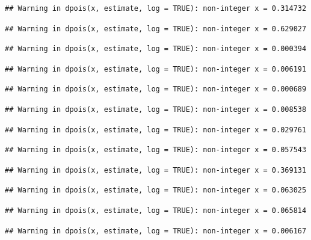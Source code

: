 \documentclass[]{article}
\begin{document}
\begin{verbatim}
## Warning in dpois(x, estimate, log = TRUE): non-integer x = 0.314732
\end{verbatim}

\begin{verbatim}
## Warning in dpois(x, estimate, log = TRUE): non-integer x = 0.629027
\end{verbatim}

\begin{verbatim}
## Warning in dpois(x, estimate, log = TRUE): non-integer x = 0.000394
\end{verbatim}

\begin{verbatim}
## Warning in dpois(x, estimate, log = TRUE): non-integer x = 0.006191
\end{verbatim}

\begin{verbatim}
## Warning in dpois(x, estimate, log = TRUE): non-integer x = 0.000689
\end{verbatim}

\begin{verbatim}
## Warning in dpois(x, estimate, log = TRUE): non-integer x = 0.008538
\end{verbatim}

\begin{verbatim}
## Warning in dpois(x, estimate, log = TRUE): non-integer x = 0.029761
\end{verbatim}

\begin{verbatim}
## Warning in dpois(x, estimate, log = TRUE): non-integer x = 0.057543
\end{verbatim}

\begin{verbatim}
## Warning in dpois(x, estimate, log = TRUE): non-integer x = 0.369131
\end{verbatim}

\begin{verbatim}
## Warning in dpois(x, estimate, log = TRUE): non-integer x = 0.063025
\end{verbatim}

\begin{verbatim}
## Warning in dpois(x, estimate, log = TRUE): non-integer x = 0.065814
\end{verbatim}

\begin{verbatim}
## Warning in dpois(x, estimate, log = TRUE): non-integer x = 0.006167
\end{verbatim}
\end{document}
